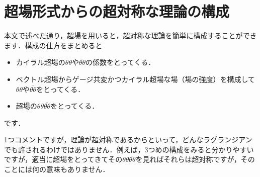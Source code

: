 \documentclass[a4paper,uplatex,dvipdfmx]{jsarticle}
\theoremstyle{definition}
\begin{document}
\section{超場形式からの超対称な理論の構成}
\label{susy_sym}

本文で述べた通り，超場を用いると，超対称な理論を簡単に構成することができます．構成の仕方をまとめると
\begin{itemize}
  \item 
  カイラル超場の$\theta\theta$や$\overline{\theta\theta}$の係数をとってくる．
  \item 
  ベクトル超場からゲージ共変かつカイラル超場な場（場の強度）を構成して$\theta\theta$や$\overline{\theta\theta}$をとってくる．
  \item 
  超場の$\theta\theta\overline{\theta\theta}$をとってくる．
\end{itemize}
です．

1つコメントですが，理論が超対称であるからといって，どんなラグランジアンでも許されるわけではありません．例えば，3つめの構成をみると分かりやすいですが，適当に超場をとってきてその$\theta\theta\overline{\theta\theta}$を見ればそれらは超対称ですが，そのことには何の意味もありません．




\nocite{Wess_SupersymmetrySupergravity_1992}
\nocite{Martin_SupersymmetryPrimer_1998}
\nocite{Bilal_IntroductionSupersymmetry_2001}
\nocite{九後_ゲー_1989}
\end{document}
